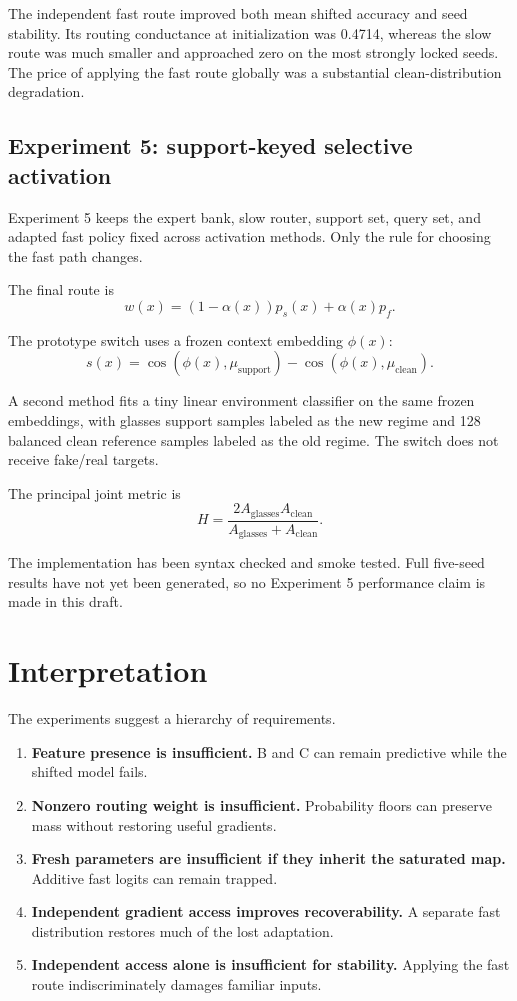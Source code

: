 \documentclass[10pt]{article}
\begin{document}
The independent fast route improved both mean shifted accuracy and seed stability. Its routing conductance at initialization was 0.4714, whereas the slow route was much smaller and approached zero on the most strongly locked seeds. The price of applying the fast route globally was a substantial clean-distribution degradation.

\subsection{Experiment 5: support-keyed selective activation}

Experiment 5 keeps the expert bank, slow router, support set, query set, and adapted fast policy fixed across activation methods. Only the rule for choosing the fast path changes.

The final route is
\[
w(x)=(1-\alpha(x))p_s(x)+\alpha(x)p_f.
\]

The prototype switch uses a frozen context embedding $\phi(x)$:
\[
s(x)=
\cos(\phi(x),\mu_{\mathrm{support}})
-
\cos(\phi(x),\mu_{\mathrm{clean}}).
\]

A second method fits a tiny linear environment classifier on the same frozen embeddings, with glasses support samples labeled as the new regime and 128 balanced clean reference samples labeled as the old regime. The switch does not receive fake/real targets.

The principal joint metric is
\[
H=
\frac{2A_{\mathrm{glasses}}A_{\mathrm{clean}}}
{A_{\mathrm{glasses}}+A_{\mathrm{clean}}}.
\]

The implementation has been syntax checked and smoke tested. Full five-seed results have not yet been generated, so no Experiment 5 performance claim is made in this draft.

\section{Interpretation}

The experiments suggest a hierarchy of requirements.

\begin{enumerate}[leftmargin=*]
    \item \textbf{Feature presence is insufficient.} B and C can remain predictive while the shifted model fails.
    \item \textbf{Nonzero routing weight is insufficient.} Probability floors can preserve mass without restoring useful gradients.
    \item \textbf{Fresh parameters are insufficient if they inherit the saturated map.} Additive fast logits can remain trapped.
    \item \textbf{Independent gradient access improves recoverability.} A separate fast distribution restores much of the lost adaptation.
    \item \textbf{Independent access alone is insufficient for stability.} Applying the fast route indiscriminately damages familiar inputs.
\end{enumerate}
\end{document}
